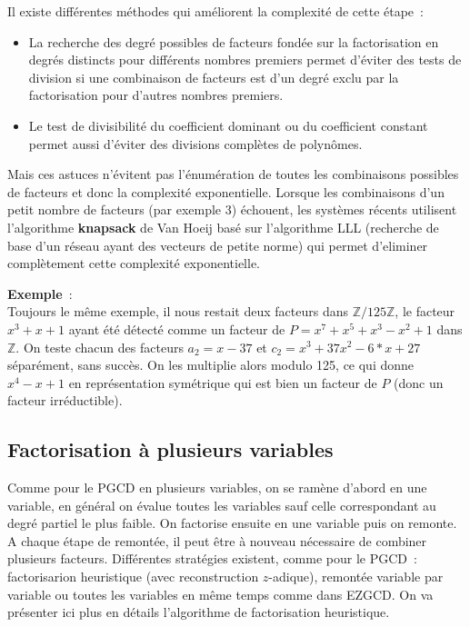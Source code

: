 \documentclass[a4paper,11pt]{article}
\newcommand{\Z}{{\mathbb{Z}}}
\begin{document}
\begin{giacjshere}
Il existe différentes méthodes
qui améliorent la complexité de cette étape~:
\begin{itemize}
\item La recherche des degré possibles de facteurs fondée sur
la factorisation en degrés distincts pour différents nombres premiers 
permet d'éviter des tests de division si une combinaison de facteurs
est d'un degré exclu par la factorisation pour d'autres nombres premiers.
\item Le test de divisibilité du coefficient dominant ou du coefficient
constant permet aussi d'éviter des divisions complètes de polynômes.
\end{itemize}
Mais ces astuces n'évitent pas l'énumération de toutes les combinaisons
possibles de facteurs et donc la complexité exponentielle. Lorsque
les combinaisons d'un petit nombre de facteurs (par exemple 3)
échouent, les systèmes récents utilisent
l'algorithme {\bf knapsack} de Van Hoeij basé sur l'algorithme LLL
(recherche de base d'un réseau ayant des vecteurs de petite norme) 
qui permet d'eliminer complètement cette complexité exponentielle.

{\bf Exemple}~:\\ 
Toujours le même exemple, il nous restait deux
facteurs dans $\Z/125 \Z$, le facteur $x^3+x+1$ ayant été
détecté comme un facteur de $P=x^7+x^5+x^3-x^2+1$ dans $\Z$.
On teste chacun des facteurs  $a_2=x-37$ et $c_2=x^3+37x^2-6*x+27$
séparément, sans succès. On les multiplie alors modulo 125,
ce qui donne $x^4-x+1$ en représentation symétrique qui est bien
un facteur de $P$ (donc un facteur irréductible).

\subsection{Factorisation à plusieurs variables}
Comme pour le PGCD en plusieurs variables, on se ramène d'abord en
une variable, en général on évalue toutes les variables sauf celle
correspondant au degré partiel le plus faible. On factorise ensuite
en une variable puis on remonte. A chaque étape de remontée, il peut
être à nouveau nécessaire de combiner plusieurs facteurs. Différentes
stratégies existent, comme pour le PGCD~: factorisarion heuristique
(avec reconstruction $z$-adique), remontée variable par variable
ou toutes les variables en même temps comme dans EZGCD.
On va présenter ici plus en détails l'algorithme de factorisation heuristique.


\end{giacjshere}
\end{document}
